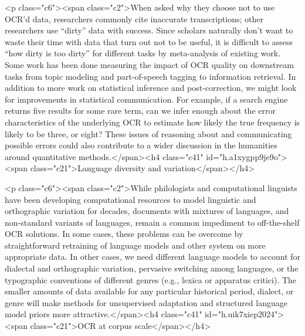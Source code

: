 \documentclass[twoside,11pt]{report}
\begin{document}
<p class="c6"><span class="c2">When asked why they choose not to use OCR'd data, researchers commonly cite inaccurate transcriptions; other researchers use ``dirty'' data with success. Since scholars naturally don't want to waste their time with data that turn out not to be useful, it is difficult to assess ``how dirty is too dirty'' for different tasks by meta-analysis of existing work. Some work has been done measuring the impact of OCR quality on downstream tasks from topic modeling and part-of-speech tagging to information retrieval. In addition to more work on statistical inference and post-correction, we might look for improvements in statistical communication. For example, if a search engine returns five results for some rare term, can we infer enough about the error characteristics of the underlying OCR to estimate how likely the true frequency is likely to be three, or eight? These issues of reasoning about and communicating possible errors could also contribute to a wider discussion in the humanities around quantitative methods.</span><h4 class="c41" id="h.a1xygpp9je9o"><span class="c21">Language diversity and variation</span></h4>

<p class="c6"><span class="c2">While philologists and computational linguists have been developing computational resources to model linguistic and orthographic variation for decades, documents with mixtures of languages, and non-standard variants of languages, remain a common impediment to off-the-shelf OCR solutions. In some cases, these problems can be overcome by straightforward retraining of language models and other system on more appropriate data. In other cases, we need different language models to account for dialectal and orthographic variation, pervasive switching among languages, or the typographic conventions of different genres (e.g., lexica or apparatus critici). The smaller amounts of data available for any particular historical period, dialect, or genre will make methods for unsupervised adaptation and structured language model priors more attractive.</span><h4 class="c41" id="h.uik7xiep2024"><span class="c21">OCR at corpus scale</span></h4>
\end{document}
